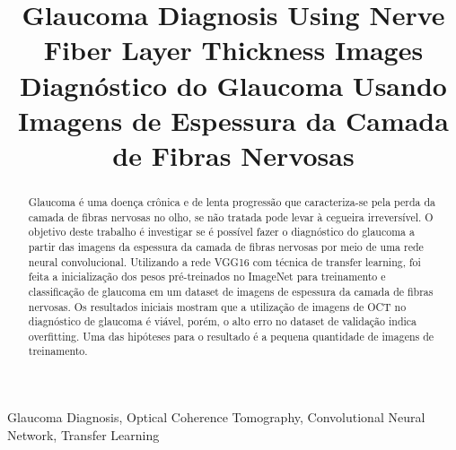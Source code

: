 \documentclass[conference]{IEEEtran}
\begin{document}
\title{Glaucoma Diagnosis Using Nerve Fiber Layer Thickness Images \\ Diagnóstico do Glaucoma Usando Imagens de Espessura da Camada de Fibras Nervosas}


\author{
}


\maketitle

\thispagestyle{fancy}

\renewcommand{\abstractname}{Abstract}
\begin{abstract}
\end{abstract}

\renewcommand\IEEEkeywordsname{Keywords}
\begin{IEEEkeywords}
\label{Keywords}
Glaucoma Diagnosis, Optical Coherence Tomography, Convolutional Neural Network, Transfer Learning
\end{IEEEkeywords}

\renewcommand{\abstractname}{Resumo}
\begin{abstract}
\label{Resumo}
Glaucoma é uma doença crônica e de lenta progressão que caracteriza-se pela perda da camada de fibras nervosas no olho, se não tratada pode levar à cegueira irreversível. 
O objetivo deste trabalho é investigar se é possível fazer o diagnóstico do glaucoma a partir das imagens da espessura da camada de fibras nervosas por meio de uma rede neural convolucional.
Utilizando a rede VGG16 com técnica de transfer learning, foi feita a inicialização dos pesos pré-treinados no ImageNet para treinamento e classificação de glaucoma em um dataset de imagens de espessura da camada de fibras nervosas.
Os resultados iniciais mostram que a utilização de imagens de OCT no diagnóstico de glaucoma é viável, porém, o alto erro no dataset de validação indica overfitting. Uma das hipóteses para o resultado é a pequena quantidade de imagens de treinamento.

\end{abstract}
\end{document}
